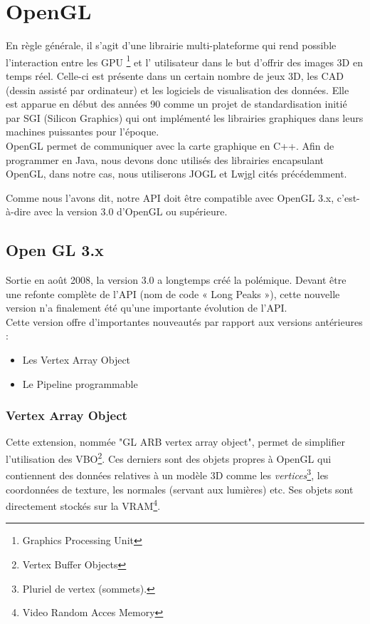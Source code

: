 \documentclass[11pt]{report}
\begin{document}
\section{OpenGL}

  En règle générale, il s'agit d'une librairie multi-plateforme qui rend possible l'interaction entre les GPU \footnote{Graphics Processing Unit} et l' utilisateur dans le but d'offrir des images 3D en temps réel. Celle-ci est présente dans un certain nombre de jeux  3D, les CAD (dessin assisté par ordinateur) et les logiciels de visualisation des données. Elle est apparue en début des années 90 comme un projet de standardisation initié par SGI (Silicon Graphics) qui ont implémenté les librairies graphiques dans leurs machines puissantes pour l'époque. 
\\

 OpenGL permet de communiquer avec la carte graphique en C++. Afin de programmer en Java, nous devons donc utilisés des librairies encapsulant OpenGL, dans notre cas, nous utiliserons JOGL et Lwjgl cités précédemment.


Comme nous l'avons dit, notre API doit être compatible avec OpenGL 3.x, c'est-à-dire avec la version 3.0 d'OpenGL ou supérieure.
\subsection{Open GL 3.x}
Sortie en août 2008, la version 3.0 a longtemps créé la polémique. Devant être une refonte complète de l'API (nom de code « Long Peaks »), cette nouvelle version n'a finalement été qu'une importante évolution de l'API.\cite{opengl3} %
\\

Cette version offre d'importantes nouveautés par rapport aux versions antérieures :
\begin{itemize}
\item Les Vertex Array Object
\item Le Pipeline programmable
\end{itemize}

\subsubsection{Vertex Array Object}
\label{EtatArtVBO}
Cette extension, nommée "GL ARB vertex array object", permet de simplifier l'utilisation des VBO\footnote{Vertex Buffer Objects}.
Ces derniers sont des objets propres à OpenGL qui contiennent des données relatives à un modèle 3D comme les \textit{vertices}\footnote{Pluriel de vertex (sommets).}, les coordonnées de texture, les normales (servant aux lumières) etc. Ses objets sont directement stockés sur la VRAM\footnote{Video Random Acces Memory}.
\end{document}

